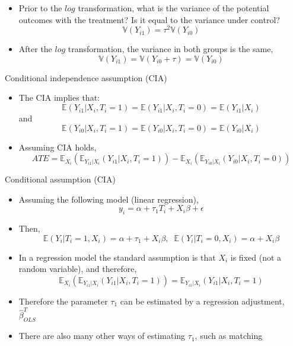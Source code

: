 \documentclass[handout]{beamer}
\theoremstyle{definition}
\begin{document}
\begin{frame}
\begin{itemize}
\item Prior to the $log$ transformation, what is the variance of the potential outcomes with the treatment? Is it equal to the variance under control?\pause
$$ \mathbb{V}(Y_{i1}) = \tau^2 \mathbb{V}(Y_{i0})$$ 
\pause
\item After the $log$ transformation, the variance in both groups is the same,
$$ \mathbb{V}(Y_{i1}) = \mathbb{V}(Y_{i0}+\tau)=\mathbb{V}(Y_{i0})$$ 
\end{itemize}
\end{frame}


\begin{frame}{Conditional independence assumption (CIA)}
\begin{itemize}
\item The CIA implies that:
$$ \mathbb{E}\left(Y_{i1}|X_i,T_i=1 \right) = \mathbb{E}\left(Y_{i1}|X_i,T_i=0 \right)
 = \mathbb{E}\left(Y_{i1}|X_i\right)$$
and 
$$ \mathbb{E}\left(Y_{i0}|X_i,T_i=1 \right) = \mathbb{E}\left(Y_{i0}|X_i,T_i=0 \right)
 = \mathbb{E}\left(Y_{i0}|X_i\right)$$
\pause
\item Assuming CIA holds, 
$$ATE =
 \mathbb{E}_{X_i}\left( \mathbb{E}_{Y_{i1}|X_i} \left(Y_{i1}|X_i,T_i=1 \right) \right)
 - \mathbb{E}_{X_i}\left( \mathbb{E}_{Y_{i0}|X_i} \left(Y_{i0}|X_i,T_i=0 \right) \right) $$
\end{itemize}
\end{frame}

\begin{frame}{Conditional assumption (CIA)}
\begin{itemize}
\item Assuming the following model (linear regression),
$$y_i = \alpha + \tau_1 T_i + X_i \beta +\epsilon$$ 
\pause
\item Then, 
$$\mathbb{E}(Y_i|T_i=1,X_i) = \alpha + \tau_1 + X_i \beta,\;\;  \mathbb{E}(Y_i|T_i=0,X_i) = \alpha + X_i \beta$$
\pause
\item In a regression model the standard assumption is that $X_i$ is fixed (not a random variable), and therefore,
$$ \mathbb{E}_{X_i}\left( \mathbb{E}_{Y_{i1}|X_i} \left(Y_{i1}|X_i,T_i=1 \right) \right) 
= \mathbb{E}_{Y_{i1}|X_i} \left(Y_{i1}|X_i,T_i=1 \right)$$
\pause
\item Therefore the parameter $\tau_1$ can be estimated by a regression adjustment, $\hat{\beta}_{OLS}^T$ 
\item There are also many other ways of estimating $\tau_1$, such as matching 
\end{itemize}
\end{frame}
\end{document}

